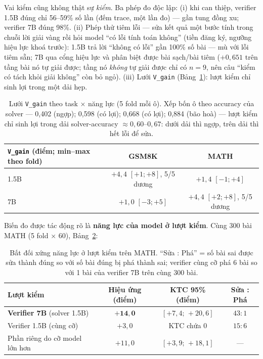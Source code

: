 \documentclass[11pt,a4paper]{article}
\begin{document}
Vai kiểm cũng không thật sự \emph{kiểm}. Ba phép đo độc lập: (i) khi can thiệp, verifier 1.5B
đúng chỉ 56--59\% số lần (đếm trace, một lần đo) --- gần tung đồng xu; verifier 7B đúng 98\%.
(ii) Phép thử tiêm lỗi --- sửa kết quả một bước tính trong chuỗi lời giải vàng rồi hỏi model
``có lỗi tính toán không'' (tiền đăng ký, ngưỡng hiệu lực khoá trước): 1.5B trả lời ``không có
lỗi'' gần 100\% số bài --- mù với lỗi tiêm sẵn; 7B qua cổng hiệu lực và phân biệt được bài
sạch/bài tiêm ($+0{,}651$ trên tầng bài nó tự giải được; tầng nó \emph{không} tự giải được chỉ
có $n=9$, nên câu ``kiểm có tách khỏi giải không'' còn bỏ ngỏ). (iii) Lưới \texttt{V\_gain}
(Bảng~\ref{tab:vgaingrid}): lượt kiểm chỉ sinh lợi trong một dải hẹp.

\begin{table}[t]\centering\small
\begin{tabular}{lcc}\toprule
\texttt{V\_gain} (điểm; min--max theo fold) & GSM8K & MATH\\\midrule
1.5B & $+4{,}4$ $[+1;+8]$, 5/5 dương & $+1{,}4$ $[-1;+4]$\\
7B   & $+1{,}0$ $[-3;+5]$ & $+4{,}4$ $[+2;+8]$, 5/5 dương\\\bottomrule
\end{tabular}
\caption{Lưới \texttt{V\_gain} theo task $\times$ năng lực (5 fold mỗi ô). Xếp bốn ô theo
accuracy của solver --- 0,402 (ngợp); 0,598 (có lợi); 0,668 (có lợi); 0,884 (bão hoà) ---
lượt kiểm chỉ sinh lợi trong dải solver-accuracy $\approx 0{,}60$--$0{,}67$: dưới dải thì
ngợp, trên dải thì hết lỗi để sửa.}
\label{tab:vgaingrid}
\end{table}

Biến đo được tác động rõ là \textbf{năng lực của model ở lượt kiểm}. Cùng 300 bài MATH
(5 fold $\times$ 60), Bảng~\ref{tab:verifier}:

\begin{table}[t]\centering\small
\begin{tabular}{lccc}\toprule
Lượt kiểm & Hiệu ứng (điểm) & KTC 95\% (điểm) & Sửa : Phá\\\midrule
\textbf{Verifier 7B} (solver 1.5B) & $\mathbf{+14{,}0}$ & $[+7{,}4;\,+20{,}6]$ & $43:1$\\
Verifier 1.5B (cùng cỡ) & $+3{,}0$ & KTC chứa 0 & $15:6$\\
Phần riêng do cỡ model lớn hơn & $+11{,}0$ & $[+3{,}9;\,+18{,}1]$ & ---\\\bottomrule
\end{tabular}
\caption{Bất đối xứng năng lực ở lượt kiểm trên MATH. ``Sửa : Phá'' = số bài sai được sửa thành
đúng so với số bài đúng bị phá thành sai; verifier cùng cỡ phá 6 bài so với 1 bài của verifier
7B trên cùng 300 bài.}
\label{tab:verifier}
\end{table}
\end{document}
